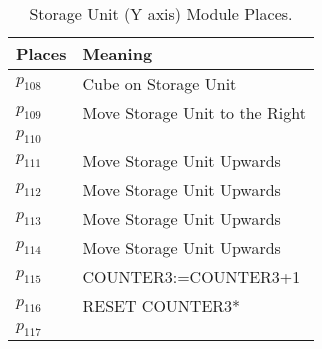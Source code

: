 \begin{table}[H]
\caption{Storage Unit (Y axis) Module Places.}
\centering
\begin{tabular}{M{5cm}M{10cm}}
Places & Meaning\\
\hline
\hyperlink{partialNet:p108}{\hypertarget{partialTable:p108}{$p_{108}$}} & Cube on Storage Unit\\
\hyperlink{partialNet:p109}{\hypertarget{partialTable:p109}{$p_{109}$}} & Move Storage Unit to the Right\\
\hyperlink{partialNet:p110}{\hypertarget{partialTable:p110}{$p_{110}$}} & \\
\hyperlink{partialNet:p111}{\hypertarget{partialTable:p111}{$p_{111}$}} & Move Storage Unit Upwards\\
\hyperlink{partialNet:p112}{\hypertarget{partialTable:p112}{$p_{112}$}} & Move Storage Unit Upwards\\
\hyperlink{partialNet:p113}{\hypertarget{partialTable:p113}{$p_{113}$}} & Move Storage Unit Upwards\\
\hyperlink{partialNet:p114}{\hypertarget{partialTable:p114}{$p_{114}$}} & Move Storage Unit Upwards\\
\hyperlink{partialNet:p115}{\hypertarget{partialTable:p115}{$p_{115}$}} & COUNTER3:=COUNTER3+1\\
\hyperlink{partialNet:p116}{\hypertarget{partialTable:p116}{$p_{116}$}} & RESET COUNTER3*\\
\hyperlink{partialNet:p117}{\hypertarget{partialTable:p117}{$p_{117}$}} & \\
\end{tabular}
\end{table}
